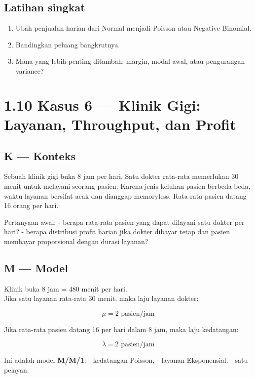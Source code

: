 \documentclass[
  letterpaper,
  DIV=11,
  numbers=noendperiod]{scrreprt}
\providecommand{\tightlist}{%
  \setlength{\itemsep}{0pt}\setlength{\parskip}{0pt}}
\begin{document}
\subsection{Latihan singkat}\label{latihan-singkat-4}

\begin{enumerate}
\def\labelenumi{\arabic{enumi}.}
\tightlist
\item
  Ubah penjualan harian dari Normal menjadi Poisson atau Negative
  Binomial.
\item
  Bandingkan peluang bangkrutnya.
\item
  Mana yang lebih penting ditambah: margin, modal awal, atau pengurangan
  variance?
\end{enumerate}

\section{1.10 Kasus 6 --- Klinik Gigi: Layanan, Throughput, dan
Profit}\label{kasus-6-klinik-gigi-layanan-throughput-dan-profit}

\subsection{K --- Konteks}\label{k-konteks-6}

Sebuah klinik gigi buka 8 jam per hari. Satu dokter rata-rata memerlukan
30 menit untuk melayani seorang pasien. Karena jenis keluhan pasien
berbeda-beda, waktu layanan bersifat acak dan dianggap memoryless.
Rata-rata pasien datang 16 orang per hari.

Pertanyaan awal: - berapa rata-rata pasien yang dapat dilayani satu
dokter per hari? - berapa distribusi profit harian jika dokter dibayar
tetap dan pasien membayar proporsional dengan durasi layanan?

\subsection{M --- Model}\label{m-model-6}

Klinik buka 8 jam = 480 menit per hari.\\
Jika satu layanan rata-rata 30 menit, maka laju layanan dokter:

\[
\mu = 2 \text{ pasien/jam}
\]

Jika rata-rata pasien datang 16 per hari dalam 8 jam, maka laju
kedatangan:

\[
\lambda = 2 \text{ pasien/jam}
\]

Ini adalah model \textbf{M/M/1}: - kedatangan Poisson, - layanan
Eksponensial, - satu pelayan.
\end{document}
